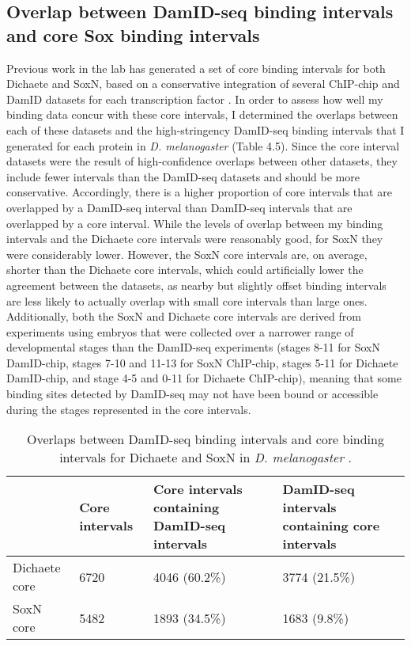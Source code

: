 \subsection{Overlap between DamID-seq binding intervals and core Sox binding intervals}
Previous work in the lab has generated a set of core binding intervals for both Dichaete and SoxN, based on a conservative integration of several ChIP-chip and DamID datasets for each transcription factor \citep{aleksic_role_2013,ferrero_soxneuro_2014}. In order to assess how well my binding data concur with these core intervals, I determined the overlaps between each of these datasets and the high-stringency DamID-seq binding intervals that I generated for each protein in \emph{D. melanogaster} (Table 4.5). Since the core interval datasets were the result of high-confidence overlaps between other datasets, they include fewer intervals than the DamID-seq datasets and should be more conservative. Accordingly, there is a higher proportion of core intervals that are overlapped by a DamID-seq interval than DamID-seq intervals that are overlapped by a core interval. While the levels of overlap between my binding intervals and the Dichaete core intervals were reasonably good, for SoxN they were considerably lower. However, the SoxN core intervals are, on average, shorter than the Dichaete core intervals, which could artificially lower the agreement between the datasets, as nearby but slightly offset binding intervals are less likely to actually overlap with small core intervals than large ones. Additionally, both the SoxN and Dichaete core intervals are derived from experiments using embryos that were collected over a narrower range of developmental stages than the DamID-seq experiments (stages 8-11 for SoxN DamID-chip, stages 7-10 and 11-13 for SoxN ChIP-chip, stages 5-11 for Dichaete DamID-chip, and stage 4-5 and 0-11 for Dichaete ChIP-chip), meaning that some binding sites detected by DamID-seq may not have been bound or accessible during the stages represented in the core intervals.\\ 

\begin{table}[h]
\centering
\begin{tabular}{|l|p{3cm}|p{4cm}|p{4cm}|}
\hline
              & \textbf{Core intervals} & \textbf{Core intervals containing DamID-seq intervals} & \textbf{DamID-seq intervals containing core intervals} \\ \hline
Dichaete core & 6720           & 4046 (60.2\%)                                 & 3774 (21.5\%)                                 \\ \hline
SoxN core     & 5482           & 1893 (34.5\%)                                 & 1683 (9.8\%)                                  \\ \hline
\end{tabular}
\caption{Overlaps between DamID-seq binding intervals and core binding intervals for Dichaete and SoxN in \emph{D. melanogaster} \citep{aleksic_role_2013,ferrero_soxneuro_2014}.}
\label{Table 4.5}
\end{table}

